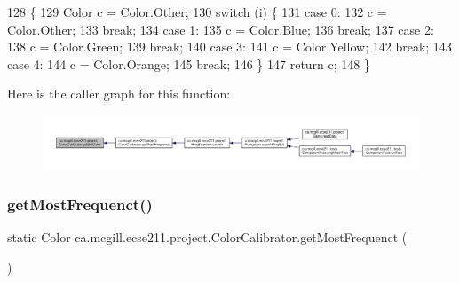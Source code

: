 \begin{DoxyCode}
128                                          \{
129     Color c = Color.Other;
130     \textcolor{keywordflow}{switch} (i) \{
131       \textcolor{keywordflow}{case} 0:
132         c = Color.Other;
133         \textcolor{keywordflow}{break};
134       \textcolor{keywordflow}{case} 1:
135         c = Color.Blue;
136         \textcolor{keywordflow}{break};
137       \textcolor{keywordflow}{case} 2:
138         c = Color.Green;
139         \textcolor{keywordflow}{break};
140       \textcolor{keywordflow}{case} 3:
141         c = Color.Yellow;
142         \textcolor{keywordflow}{break};
143       \textcolor{keywordflow}{case} 4:
144         c = Color.Orange;
145         \textcolor{keywordflow}{break};
146     \}
147     \textcolor{keywordflow}{return} c;
148   \}
\end{DoxyCode}
Here is the caller graph for this function\+:\nopagebreak
\begin{figure}[H]
\begin{center}
\leavevmode
\includegraphics[width=350pt]{classca_1_1mcgill_1_1ecse211_1_1project_1_1_color_calibrator_acb1d9cef0739971dbe00cc16712be0fe_icgraph}
\end{center}
\end{figure}
\mbox{\label{classca_1_1mcgill_1_1ecse211_1_1project_1_1_color_calibrator_a3d65927aaa2041f933dbdc19c3d2a412}} 
\subsubsection{\texorpdfstring{get\+Most\+Frequenct()}{getMostFrequenct()}}
{\footnotesize\ttfamily static Color ca.\+mcgill.\+ecse211.\+project.\+Color\+Calibrator.\+get\+Most\+Frequenct (\begin{DoxyParamCaption}{ }\end{DoxyParamCaption})\hspace{0.3cm}{\ttfamily [static]}}

